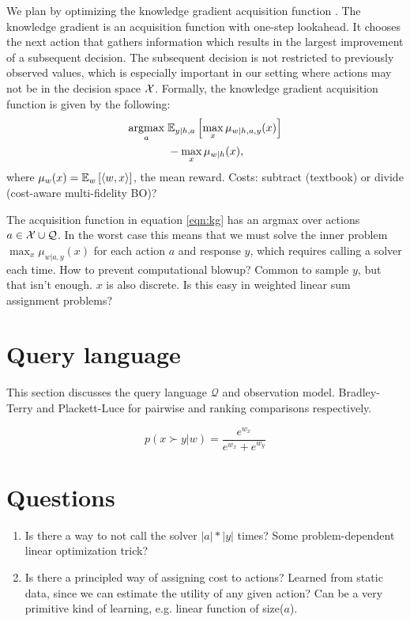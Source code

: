 \documentclass{article}
\theoremstyle{plain}
\theoremstyle{definition}
\theoremstyle{remark}
\begin{document}
We plan by optimizing the knowledge gradient acquisition function \citep{kg}.
The knowledge gradient is an acquisition function with one-step lookahead.
It chooses the next action that gathers information which results in the largest improvement of a subsequent decision.
The subsequent decision is not restricted to previously observed values,
which is especially important in our setting where actions may not be in the decision space $\mathcal{X}$.
Formally, the knowledge gradient acquisition function is given by the following:
\begin{equation}
\label{eqn:kg}
\begin{aligned}
\operatorname*{argmax}_a \; & \mathbb{E}_{y|h,a}\left[\max_x \mu_{w|h,a,y}(x)\right]\\
&- \max_{x} \mu_{w|h}(x),
\end{aligned}
\end{equation}
where $\mu_w(x) = \mathbb{E}_{w}\left[\langle w,x \rangle\right]$, the mean reward.
Costs: subtract (textbook) or divide (cost-aware multi-fidelity BO)?

The acquisition function in equation \ref{eqn:kg} has an argmax over actions $a \in \mathcal{X} \cup \mathcal{Q}$.
In the worst case this means that we must solve the inner problem
$\max_x \mu_{w|a,y}(x)$ for each action $a$ and response $y$,
which requires calling a solver each time.
How to prevent computational blowup?
Common to sample $y$, but that isn't enough.
$x$ is also discrete. Is this easy in weighted linear sum assignment problems?

\section{Query language}
This section discusses the query language $\mathcal{Q}$ and observation model.
Bradley-Terry and Plackett-Luce for pairwise and ranking comparisons respectively.

\begin{equation}
p(x \succ y | w)= \frac{e^{w_x}}{e^{w_x} + e^{w_y}}
\end{equation}

\section{Questions}
\begin{enumerate}
    \item Is there a way to not call the solver $|a|*|y|$ times? Some problem-dependent linear optimization trick?
    \item Is there a principled way of assigning cost to actions? Learned from static data, since we can estimate the utility of any given action? Can be a very primitive kind of learning, e.g. linear function of size($a$).
\end{enumerate}
\end{document}
